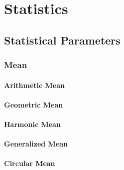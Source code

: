 \section{Statistics}

\subsection{Statistical Parameters}

\subsubsection{Mean}


\paragraph{Arithmetic Mean}

\paragraph{Geometric Mean}

\paragraph{Harmonic Mean}

\paragraph{Generalized Mean}



\paragraph{Circular Mean}






